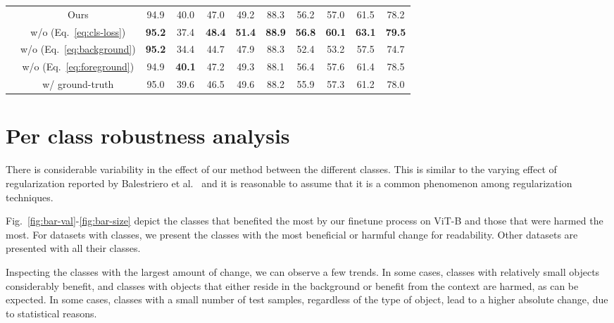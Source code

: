 \documentclass{article}
\begin{document}
\begin{table}[h!]
\begin{center}
{\begin{tabular}{@{}l@{~~}c@{~~~~}c@{~~~~}c@{~~~~}c@{~~~~}c@{~~~~}c@{~~~~}c@{~~~~}c@{~~~~}c@{~~~~}c@{}}
        & \small{Ours}  & 94.9 & 40.0 & 47.0 & 49.2 & 88.3 & 56.2 & 57.0 & 61.5 & 78.2\\
        &\small{w/o  (Eq.~\ref{eq:cls-loss}})  & \textbf{95.2} & 37.4 & \textbf{48.4} & \textbf{51.4} & \textbf{88.9} & \textbf{56.8} & \textbf{60.1} & \textbf{63.1} & \textbf{79.5} \\
        &\small{w/o  (Eq.~\ref{eq:background})}  & \textbf{95.2} & 34.4 & 44.7 & 47.9 & 88.3 & 52.4 & 53.2 & 57.5 & 74.7 \\
        &\small{w/o  (Eq.~\ref{eq:foreground})} & 94.9 & \textbf{40.1} & 47.2 & 49.3 & 88.1 & 56.4 & 57.6 & 61.4 & 78.5 \\
        &\small{w/ ground-truth} & 95.0 & 39.6 & 46.5 & 49.6 & 88.2 & 55.9 & 57.3 & 61.2 & 78.0  \\
        \bottomrule
    \end{tabular}
    }
    \smallskip
    \smallskip
    \label{table:ablation_r5}
    \end{center}
    \vspace{-24px}
\end{table}

\clearpage

\section{Per class robustness analysis}
\label{sec:limitations}

There is considerable variability in the effect of our method between the different classes. This is similar to the varying effect of regularization reported by Balestriero et al.~\cite{balestriero2022effects} and it is reasonable to assume that it is a common phenomenon among regularization techniques.

Fig.~\ref{fig:bar-val}-\ref{fig:bar-size} depict the classes that benefited the most by our finetune process on ViT-B and those that were harmed the most. For datasets with   classes, we present the  classes with the most beneficial or harmful change for readability. Other datasets are presented with all their classes.


Inspecting the classes with the largest amount of change, we can observe a few trends. In some cases, classes with relatively small objects considerably benefit, and classes with objects that either reside in the background or benefit from the context are harmed, as can be expected. In some cases, classes with a small number of test samples, regardless of the type of object, lead to a higher absolute change, due to statistical reasons.
\end{document}
